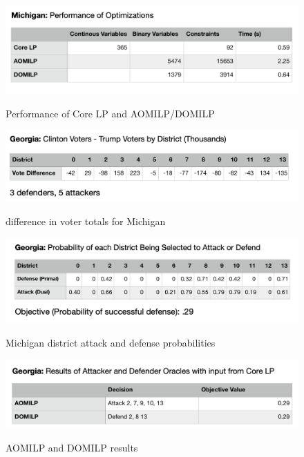 \documentclass[letterpaper]{article} %
\begin{document}
\begin{figure}
    \includegraphics[width=\linewidth]{michigan_perfs}
    \label{michigan_perfs}
    \caption{Performance of Core LP and AOMILP/DOMILP}
\end{figure}

\begin{figure}
    \includegraphics[width=\linewidth]{georgia_votes}
    \label{georgia_votes}
   \caption{difference in voter totals for Michigan}
\end{figure}

\begin{figure}
    \includegraphics[width=\linewidth]{georgia_probs}
    \label{georgia_probs}
   \caption{Michigan district attack and defense probabilities}
\end{figure}

\begin{figure}
    \includegraphics[width=\linewidth]{georgia_oracles}
    \label{georgia_oracles}
\caption{AOMILP and DOMILP results}
\end{figure}
\end{document}
